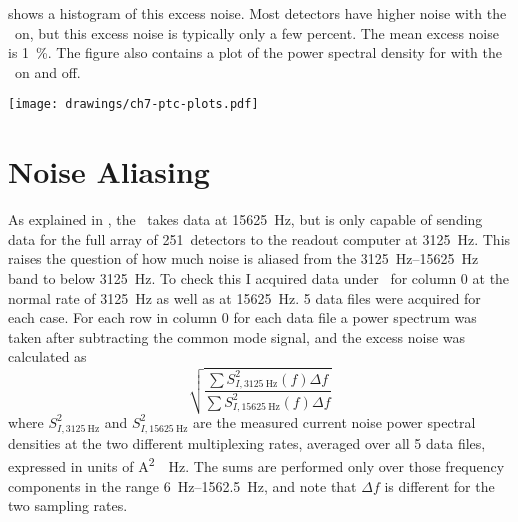  shows a histogram of this excess noise. Most detectors have higher noise with the \PTC\ on, but this excess noise is typically only a few percent. 
The mean excess noise is \SI{1}{\percent}.
The figure also contains a plot of the power spectral density for  with the \PTC\ on and off.

\begin{figure*}
  \centering
\texttt{[image: drawings/ch7-ptc-plots.pdf]}
\caption{%
\textbf{Left}
Histogram showing excess noise due to the \PTC, defined as ratio of total noise above \SI{6}{\Hz} (see text for precise definition).
More detectors have higher noise with the \PTC\ on than off, but the mean excess noise is only \SI{1}{\percent}.
\textbf{Right}
Current noise for  with \PTC\ on and off, after subtracting common mode noise.
The noise below \SI{30}{\Hz} is 1.5--2.5 times higher with the \PTC\ on, but the total noise at the relevant frequencies of $f >= \SI{6}{\Hz}$ is only \SI{2.9}{\percent}.
}
\label{fig:ch7-ptc-plots}
\end{figure*}

\section{Noise Aliasing}

As explained in , the \MCE\ takes data at \SI{15625}{\hertz}, but is only capable of sending data for the full array of 251~detectors to the readout computer at \SI{3125}{\hertz}.
This raises the question of how much noise is aliased from the \SIrange{3125}{15625}{\hertz} band to below \SI{3125}{\hertz}.
To check this I acquired data under \SOC\ for column 0 at the normal rate of \SI{3125}{\hertz} as well as at \SI{15625}{\hertz}.
5 data files were acquired for each case. For each row in column 0 for each data file a power spectrum was taken after subtracting the common mode signal, and the excess noise was calculated as
\begin{equation}
  \sqrt{  \frac{ \sum S^2_{I,\SI{3125}{\Hz}}(f) \Delta f }
               { \sum S^2_{I,\SI{15625}{\Hz}}(f) \Delta f }}
\end{equation}
where $S^2_{I,\SI{3125}{\Hz}}$ and $S^2_{I,\SI{15625}{\Hz}}$ are the measured current noise power spectral densities at the two different multiplexing rates, averaged over all 5 data files, expressed in units of \si{\A^2 \per \Hz}.
The sums are performed only over those frequency components in the range \SIrange{6}{1562.5}{\Hz}, and note that $\Delta f$ is different for the two sampling rates.


